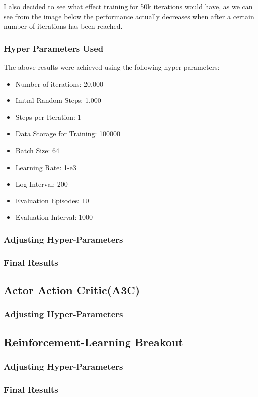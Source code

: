 \documentclass[conference]{IEEEtran}
\begin{document}
I also decided to see what effect training for 50k iterations would have, as we can see from the image below the performance actually decreases when after a certain number of iterations has been reached.  
\subsubsection{Hyper Parameters Used}
The above results were achieved using the following hyper parameters:
\begin{itemize}
    \item Number of iterations: 20,000
    \item Initial Random Steps: 1,000
    \item Steps per Iteration: 1
    \item Data Storage for Training: 100000
    \item Batch Size: 64
    \item Learning Rate: 1-e3
    \item Log Interval: 200
    \item Evaluation Episodes: 10
    \item Evaluation Interval: 1000
\end{itemize}
\subsubsection{Adjusting Hyper-Parameters}
\subsubsection{Final Results}

\subsection{Actor Action Critic(A3C)}

\subsubsection{Adjusting Hyper-Parameters}

\subsection{Reinforcement-Learning Breakout}
\subsubsection{Adjusting Hyper-Parameters}
\subsubsection{Final Results}
\end{document}

